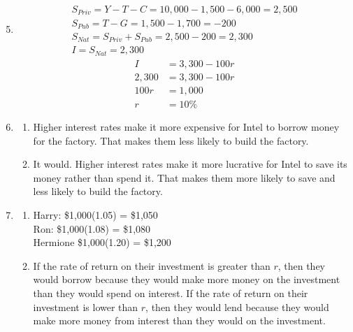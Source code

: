 \documentclass{article}
\begin{document}
\begin{enumerate}

\setcounter{enumi}{4}

\item \begin{gather*}
	S_{Priv} = Y - T - C = 10,000 - 1,500 - 6,000 = 2,500 \\
	S_{Pub} = T - G = 1,500 - 1,700 = -200 \\
	S_{Nat} = S_{Priv} + S_{Pub} = 2,500 - 200 = 2,300 \\
	I = S_{Nat} = 2,300
	\end{gather*}
	\begin{align*}
	I &= 3,300 - 100r \\
	2,300 &= 3,300 - 100r \\
	100r &= 1,000 \\
	r &= 10\%
	\end{align*}
	
\item

	\begin{enumerate}
	
	\item Higher interest rates make it more expensive for Intel to borrow money for the factory. That makes them less likely to build the factory. 
	
	\item It would. Higher interest rates make it more lucrative for Intel to save its money rather than spend it. That makes them more likely to save and less likely to build the factory.
	
	\end{enumerate}
	
\item

	\begin{enumerate}
	
	\item Harry: \$1,000(1.05) = \$1,050 \\
		Ron: \$1,000(1.08) = \$1,080 \\
		Hermione \$1,000(1.20) = \$1,200
		
	\item If the rate of return on their investment is greater than $r$, then they would borrow because they would make more money on the investment than they would spend on interest. If the rate of return on their investment is lower than $r$, then they would lend because they would make more money from interest than they would on the investment.
	

\end{enumerate}
\end{enumerate}
\end{document}
